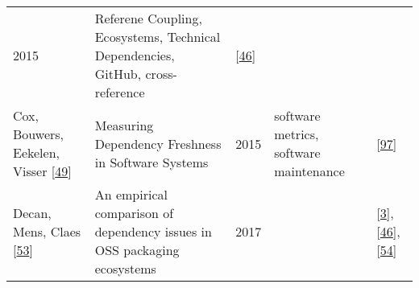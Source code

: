 \documentclass[]{book}
\begin{document}
\begin{longtable}[]{@{}lllll@{}}
\begin{minipage}[t]{0.02\columnwidth}
2015\strut
\end{minipage} & \begin{minipage}[t]{0.24\columnwidth}\raggedright\strut
Referene Coupling, Ecosystems, Technical Dependencies, GitHub,
cross-reference\strut
\end{minipage} & \begin{minipage}[t]{0.16\columnwidth}\raggedright\strut
{[}\protect\hyperlink{ref-Constantinou2017}{46}{]}\strut
\end{minipage}\tabularnewline
\begin{minipage}[t]{0.12\columnwidth}\raggedright\strut
Cox, Bouwers, Eekelen, Visser
{[}\protect\hyperlink{ref-Cox2015}{49}{]}\strut
\end{minipage} & \begin{minipage}[t]{0.31\columnwidth}\raggedright\strut
Measuring Dependency Freshness in Software Systems\strut
\end{minipage} & \begin{minipage}[t]{0.02\columnwidth}\raggedright\strut
2015\strut
\end{minipage} & \begin{minipage}[t]{0.24\columnwidth}\raggedright\strut
software metrics, software maintenance\strut
\end{minipage} & \begin{minipage}[t]{0.16\columnwidth}\raggedright\strut
{[}\protect\hyperlink{ref-Kikas2017}{97}{]}\strut
\end{minipage}\tabularnewline
\begin{minipage}[t]{0.12\columnwidth}\raggedright\strut
Decan, Mens, Claes {[}\protect\hyperlink{ref-Decan2017}{53}{]}\strut
\end{minipage} & \begin{minipage}[t]{0.31\columnwidth}\raggedright\strut
An empirical comparison of dependency issues in OSS packaging
ecosystems\strut
\end{minipage} & \begin{minipage}[t]{0.02\columnwidth}\raggedright\strut
2017\strut
\end{minipage} & \begin{minipage}[t]{0.24\columnwidth}\raggedright\strut
\strut
\end{minipage} & \begin{minipage}[t]{0.16\columnwidth}\raggedright\strut
{[}\protect\hyperlink{ref-Abdalkareem2017}{3}{]},
{[}\protect\hyperlink{ref-Constantinou2017}{46}{]},
{[}\protect\hyperlink{ref-Decan2018}{54}{]}\strut
\end{minipage}\tabularnewline

\end{longtable}
\end{document}
